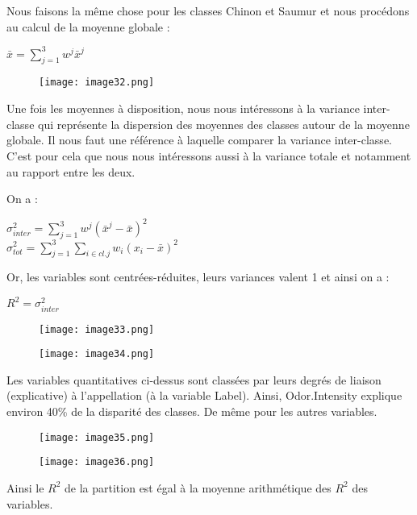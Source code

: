 \documentclass{article}
\begin{document}
Nous faisons la même chose pour les classes Chinon et Saumur et nous procédons au calcul de la moyenne globale :

\begin{center}
    \textbf{$\bar{x} = \sum_{j=1}^{3}w^j\bar{x}^j$}
\end{center}


\begin{figure}[H]
    \centering
    \texttt{[image: image32.png]}
    \label{fig:enter-label}
\end{figure}

Une fois les moyennes à disposition, nous nous intéressons à la variance inter-classe qui représente la dispersion des moyennes des classes autour de la moyenne globale. Il nous faut une référence à laquelle comparer la variance inter-classe. C'est pour cela que nous nous intéressons aussi à la variance totale et notamment au rapport entre les deux.

On a : 

\begin{center}
    \textbf{$\sigma^2_{inter} = \sum_{j=1}^{3}w^j(\bar{x}^j-\bar{x})^2$} \\
    $\sigma^2_{tot} = \sum_{j=1}^{3}\sum_{i \in cl.j}w_i(x_i-\bar{x})^2$
\end{center}

Or, les variables sont centrées-réduites, leurs variances valent 1 et ainsi on a : 
\begin{center}
    $R^2 = \sigma_{inter}^{2}$
\end{center}

\begin{figure}[H]
    \centering
    \texttt{[image: image33.png]}
    \label{fig:enter-label}
\end{figure}

\begin{figure}[H]
    \centering
    \texttt{[image: image34.png]}
    \label{fig:enter-label}
\end{figure}

Les variables quantitatives ci-dessus sont classées par leurs degrés de liaison (explicative) à l'appellation (à la variable Label). Ainsi, Odor.Intensity explique environ 40\% de la disparité des classes. De même pour les autres variables.

\begin{figure}[H]
    \centering
    \texttt{[image: image35.png]}
    \label{fig:enter-label}
\end{figure}

\begin{figure}[H]
    \centering
    \texttt{[image: image36.png]}
    \label{fig:enter-label}
\end{figure}

Ainsi le $R^2$ de la partition est égal à la moyenne arithmétique des $R^2$ des variables. 
\end{document}
